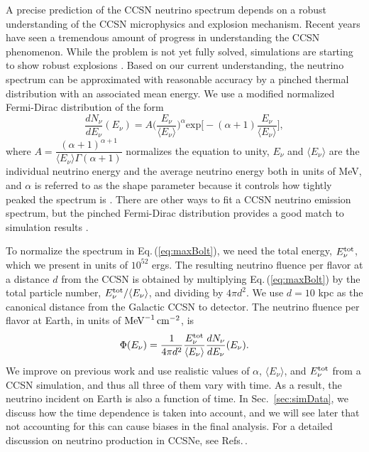 \documentclass[aps,reprint,superscriptaddress]{revtex4-1}
\begin{document}
A precise prediction of the CCSN neutrino spectrum depends on a robust understanding of the CCSN microphysics and explosion mechanism.  Recent years have seen a tremendous amount of progress in understanding the CCSN phenomenon. While the problem is not yet fully solved, simulations are starting to show robust explosions \cite{Hix:2016qoa,Maund:2017hvo,Janka:2017vlw,Janka:2017vcp,Burrows:2016ohd,Kuroda:2017trn,OConnor:2015rwy,OConnor:2014sgn,Takiwaki:2016qgc}. Based on our current understanding, the neutrino spectrum can be approximated with reasonable accuracy by a pinched thermal distribution with an associated mean energy. We use a modified normalized Fermi-Dirac distribution of the form \cite{Keil:2002in}
\begin{equation} \label{eq:maxBolt}
\frac{dN_\nu}{dE_\nu}(E_{\nu})=A\bigg(\frac{E_{\nu}}{\langle E_{\nu}\rangle}\bigg)^{\alpha}\text{exp}\bigg[-(\alpha+1)\frac{E_{\nu}}{\langle E_{\nu}\rangle}\bigg],
\end{equation}
where $A=\dfrac{(\alpha+1)^{\alpha+1}}{\langle E_{\nu}\rangle\Gamma(\alpha+1)}$ normalizes the equation to unity, $E_{\nu}$ and $\langle E_{\nu}\rangle$ are the individual neutrino energy and the average neutrino energy both in units of MeV, and $\alpha$ is referred to as the shape parameter because it controls how tightly peaked the spectrum is \cite{Keil:2002in,Tamborra:2012ac}.  There are other ways to fit a CCSN neutrino emission spectrum, but the pinched Fermi-Dirac distribution provides a good match to simulation results \cite{Raffelt:2002tu,Tamborra:2012ac}.

To normalize the spectrum in Eq.\,(\ref{eq:maxBolt}), we need the total energy, $E_{\nu}^{\rm tot}$, which we present in units of $10^{52}$ ergs.  The resulting neutrino fluence per flavor at a distance $d$ from the CCSN is obtained by multiplying Eq.\,(\ref{eq:maxBolt}) by the total particle number, $E_{\nu}^{\rm tot}/\langle E_{\nu}\rangle$, and dividing by $4\pi d^{2}$. We use $d=10$ kpc as the canonical distance from the Galactic CCSN to detector.  The neutrino fluence per flavor at Earth, in units of ${\rm MeV}^{-1} \, {\rm cm}^{-2}$, is
\begin{equation} \label{eq:fluence}
\Phi(E_{\nu})=\frac{1}{4\pi d^{2}}\frac{E_{\nu}^{\rm tot}}{\langle E_{\nu}\rangle}\frac{dN_\nu}{dE_\nu}(E_{\nu}).
\end{equation}
We improve on previous work and use realistic values of $\alpha$, $\langle E_{\nu}\rangle$, and $E_{\nu}^{\rm tot}$ from a CCSN simulation, and thus all three of them vary with time.  As a result, the neutrino incident on Earth is also a function of time.  In Sec.~\ref{sec:simData}, we discuss how the time dependence is taken into account, and we will see later that not accounting for this can cause biases in the final analysis. For a detailed discussion on neutrino production in CCSNe, see Refs.\,\cite{Thompson:2002mw,Tomas:2004gr,Suwa:2008sf,Marek:2008qi,Huedepohl:2009wh}.
\end{document}
